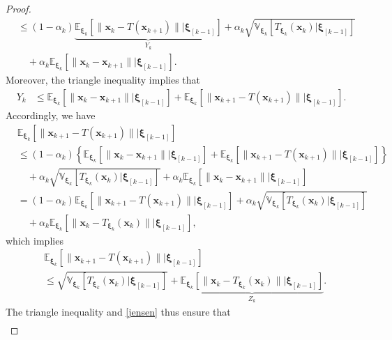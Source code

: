 \documentclass[smallextended,referee,envcountsect,]{svjour3}
\begin{document}
\begin{proof}
\begin{align*}
&\leq
(1-\alpha_k) \underbrace{\mathbb{E}_{\bm{\xi}_k} \left[ \| \bm{x}_{k} - T (\bm{x}_{k+1}) \| \big| \bm{\xi}_{[k-1]} \right]}_{Y_k}
+ \alpha_k \sqrt{\mathbb{V}_{\bm{\xi}_k} \left[ T_{\bm{\xi}_k} (\bm{x}_{k}) \big| \bm{\xi}_{[k-1]} \right]}\\
&\quad 
+ \alpha_k \mathbb{E}_{\bm{\xi}_k} \left[ \| \bm{x}_{k} - \bm{x}_{k+1} \| \big| \bm{\xi}_{[k-1]} \right].
\end{align*}
Moreover, the triangle inequality implies that
\begin{align*}
Y_k 
&\leq
\mathbb{E}_{\bm{\xi}_k} \left[ \| \bm{x}_{k} -  \bm{x}_{k+1} \| \big| \bm{\xi}_{[k-1]} \right]
+
\mathbb{E}_{\bm{\xi}_k} \left[ \| \bm{x}_{k+1} -  T (\bm{x}_{k+1}) \| \big| \bm{\xi}_{[k-1]} \right].
\end{align*}
Accordingly, we have 
\begin{align*}
&\mathbb{E}_{\bm{\xi}_k} \left[ \| \bm{x}_{k+1} - T (\bm{x}_{k+1}) \| \big| \bm{\xi}_{[k-1]} \right]\\
&\leq
(1-\alpha_k) 
\left\{
\mathbb{E}_{\bm{\xi}_k} \left[ \| \bm{x}_{k} - \bm{x}_{k+1} \| \big| \bm{\xi}_{[k-1]} \right]
+
\mathbb{E}_{\bm{\xi}_k} \left[ \| \bm{x}_{k+1} -  T (\bm{x}_{k+1}) \| \big| \bm{\xi}_{[k-1]} \right]
\right\}\\
&\quad + \alpha_k \sqrt{\mathbb{V}_{\bm{\xi}_k} \left[ T_{\bm{\xi}_k} (\bm{x}_{k}) \big| \bm{\xi}_{[k-1]} \right]} 
+ \alpha_k \mathbb{E}_{\bm{\xi}_k} \left[ \| \bm{x}_{k} - \bm{x}_{k+1} \| \big| \bm{\xi}_{[k-1]} \right]\\
&= 
(1 - \alpha_k)\mathbb{E}_{\bm{\xi}_k} \left[ \| \bm{x}_{k+1} -  T (\bm{x}_{k+1}) \| \big| \bm{\xi}_{[k-1]} \right]
+ \alpha_k \sqrt{\mathbb{V}_{\bm{\xi}_k} \left[ T_{\bm{\xi}_k} (\bm{x}_{k}) \big| \bm{\xi}_{[k-1]} \right]}\\
&\quad 
+ \alpha_k \mathbb{E}_{\bm{\xi}_k} \left[ \| \bm{x}_{k} - T_{\bm{\xi}_k} (\bm{x}_{k}) \| \big| \bm{\xi}_{[k-1]} \right],
\end{align*}
which implies
\begin{align*}
&\mathbb{E}_{\bm{\xi}_k} \left[ \| \bm{x}_{k+1} - T (\bm{x}_{k+1}) \| \big| \bm{\xi}_{[k-1]} \right]\\
&\leq 
\sqrt{\mathbb{V}_{\bm{\xi}_k} \left[ T_{\bm{\xi}_k} (\bm{x}_{k}) \big| \bm{\xi}_{[k-1]} \right]}
+ 
\underbrace{\mathbb{E}_{\bm{\xi}_k} \left[ \| \bm{x}_{k} - T_{\bm{\xi}_k} (\bm{x}_{k}) \| \big| \bm{\xi}_{[k-1]} \right]}_{Z_k}.
\end{align*} 
The triangle inequality and \eqref{jensen} thus ensure that 
\begin{align*}

\end{align*}
\end{proof}
\end{document}
